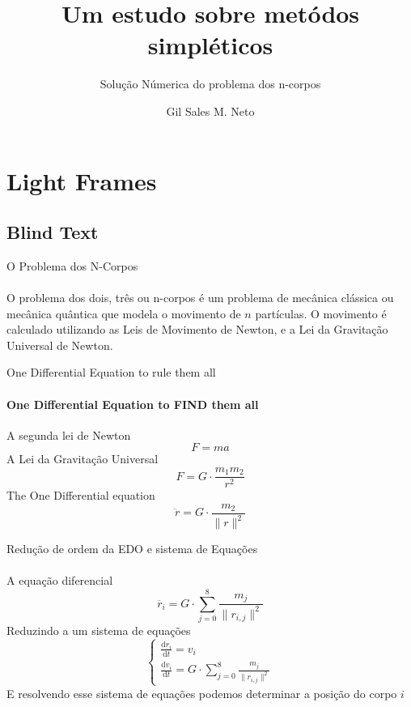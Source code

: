 \documentclass{beamer}
\title{Um estudo sobre metódos simpléticos} %
\subtitle{Solução Númerica do problema dos n-corpos} %
\author{Gil Sales M. Neto}
\begin{document}
  \frame{\maketitle}


    \section{Light Frames}
    \subsection{Blind Text}
    \begin{frame}{O Problema dos N-Corpos}
      \framesubtitle{}%
      O problema dos dois, três ou n-corpos é um problema de mecânica clássica ou mecânica quântica que modela o movimento de \(n\) partículas. O movimento é calculado utilizando as Leis de Movimento de Newton, e a Lei da Gravitação Universal de Newton.
    \end{frame}

    \begin{frame}{One Differential Equation to rule them all}
      \framesubtitle{One Differential Equation to FIND them all}%
      A segunda lei de Newton
      \[F = ma\]
      A Lei da Gravitação Universal
      \[F = G \cdot \frac{m_1 m_2}{r ^2}\]
      The One Differential equation
      \[
        \ddot{r} = G \cdot \frac{m_2}{\lVert r \rVert ^2}
      \]
    \end{frame}

    \begin{frame}{Redução de ordem da EDO e sistema de Equações}
      \framesubtitle{}%
      A equação diferencial
      \[
        \ddot{r_i} = G \cdot \sum_{j = 0}^{8}\frac{m_j}{\lVert r_{i,j} \rVert ^2}
      \]
      Reduzindo a um sistema de equações
      \[
      \begin{cases}
        \frac{\mathrm{d}r_i}{\mathrm{d}t} = v_i \\
        \frac{\mathrm{d}v_i}{\mathrm{d}t} = G \cdot \sum_{j = 0}^{8}\frac{m_j}{\lVert r_{i,j} \rVert ^2}
      \end{cases}
      \]
      E resolvendo esse sistema de equações podemos determinar a posição do corpo \(i\)
    \end{frame}
\end{document}
